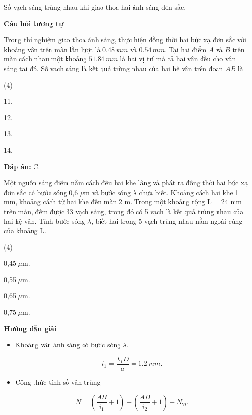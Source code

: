\begin{dang}{Số vạch sáng trùng nhau khi giao thoa hai ánh sáng đơn sắc.}
{	\begin{center}
		\textbf{Câu hỏi tương tự}
	\end{center}

Trong thí nghiệm giao thoa ánh sáng, thực hiện đồng thời hai bức xạ đơn sắc với khoảng vân trên màn lần lượt là $ \SI{0,48}{mm} $ và $ \SI{0,54}{mm} $. Tại hai điểm $ A $ và $ B $ trên màn cách nhau một khoảng $ \SI{51,84}{mm} $ là hai vị trí mà cả hai vân đều cho vân sáng tại đó. Số vạch sáng là kết quả trùng nhau của hai hệ vân trên đoạn $ AB $ là
\begin{mcq}(4)
			\item 11.			
			\item 12.				
			\item 13.			
			\item 14.
		\end{mcq}

\textbf{Đáp án:} C.
}

	{
Một nguồn sáng điểm nằm cách đều hai khe lâng và phát ra đồng thời hai bức xạ đơn sắc có bước sóng 0,6 $\mu$m và bước sóng $\lambda$  chưa biết. Khoảng cách hai khe 1 mm, khoảng cách từ hai khe đến màn 2 m. Trong một khoảng rộng L = 24 mm trên màn, đếm được 33 vạch sáng, trong đó có 5 vạch là kết quả trùng nhau của hai hệ vân. Tính bước sóng $\lambda$, biết hai trong 5 vạch trùng nhau nằm ngoài cùng của khoảng L.
\begin{mcq}(4)
\item 0,45 $\mu$m.		
\item 0,55 $\mu$m.			
\item 0,65 $\mu$m.		
\item 0,75 $\mu$m.
\end{mcq}
}
	{
		\begin{center}
			\textbf{Hướng dẫn giải}
		\end{center}
\begin{itemize}
	\item Khoảng vân ánh sáng có bước sóng $\lambda_1$
	
	\begin{equation*}
		i_1=\dfrac{\lambda_1 D}{a}= \SI{1,2}{mm}.
	\end{equation*}

	\item Công thức tính số vân trùng
	
	\begin{equation*}
		N= \left(\dfrac{AB}{i_1}+1\right) +\left(\dfrac{AB}{i_2}+1\right) - N_{\text{vs}}.
	\end{equation*}


\end{itemize}}
\end{dang}
